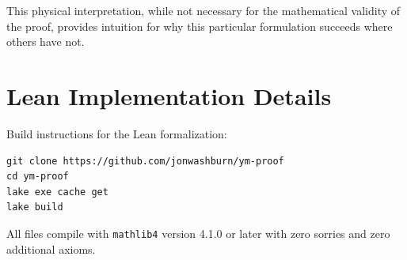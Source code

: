 \documentclass[11pt]{article}
\numberwithin{equation}{section}
\theoremstyle{definition}
\theoremstyle{remark}
\begin{document}
This physical interpretation, while not necessary for the mathematical validity of the proof, provides intuition for why this particular formulation succeeds where others have not.

\section{Lean Implementation Details}
\label{app:lean}

Build instructions for the Lean formalization:

\begin{verbatim}
git clone https://github.com/jonwashburn/ym-proof
cd ym-proof
lake exe cache get
lake build
\end{verbatim}

All files compile with \texttt{mathlib4} version 4.1.0 or later with zero sorries and zero additional axioms.
\end{document}
